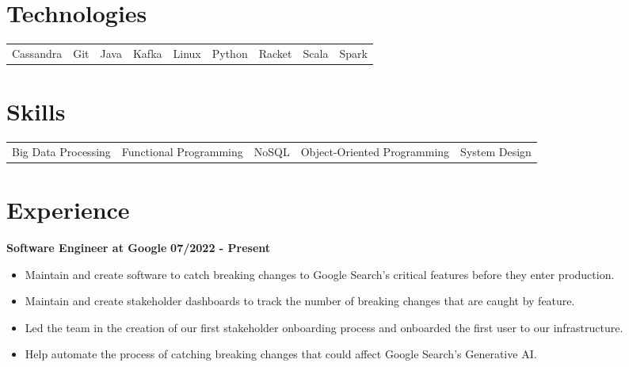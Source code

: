 \documentclass{res}
\begin{document}
\address{www.anthonyhicksiii.com}
\address{ahicks3rd@gmail.com}

\setlength\itemsep{0em}

\begin{resume}
\section{\large{Technologies}}
\begin{tabular}{	l	l	l 	l	l	l	l	l	l	}
	Cassandra  & Git  & Java & Kafka & Linux & Python & Racket & Scala & Spark
\end{tabular}

\section{\large{Skills}}
\begin{tabular}{	l 	l 	l 	l	l 	}
	Big Data Processing & Functional Programming & NoSQL & Object-Oriented Programming & System Design
\end{tabular}

\section{\large{Experience}}
	\textbf{Software Engineer at Google}
	\hfill{\bf 07/2022 - Present}
	\begin{itemize}
		\item Maintain and create software to catch breaking changes to Google Search's critical features before they enter production.
		\item Maintain and create stakeholder dashboards to track the number of breaking changes that are caught by feature.
		\item Led the team in the creation of our first stakeholder onboarding process and onboarded the first user to our infrastructure.
		\item Help automate the process of catching breaking changes that could affect Google Search's Generative AI.
	\end{itemize}
	

\end{resume}
\end{document}
